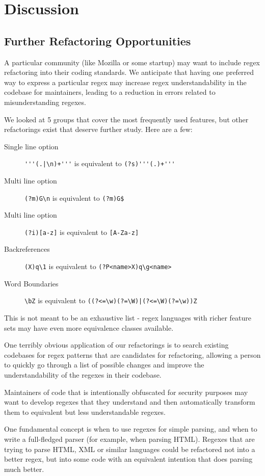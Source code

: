 \section{Discussion}
\label{sec:discussion}

\subsection{Further Refactoring Opportunities}
A particular community (like Mozilla or some startup) may want to include regex refactoring into their coding standards.  We anticipate that having one preferred way to express a particular regex may increase regex understandability in the codebase for maintainers, leading to a reduction in errors related to misunderstanding regexes.

We looked at 5 groups that cover the most frequently used features, but other refactorings exist that deserve further study.  Here are a few:
\begin{description}
\item[Single line option]  \verb!'''(.|\n)+'''! is equivalent to \verb!(?s)'''(.)+'''!
\item[Multi line option]  \verb!(?m)G\n! is equivalent to \verb!(?m)G$!
\item[Multi line option]  \verb!(?i)[a-z]! is equivalent to \verb![A-Za-z]!
\item[Backreferences]  \verb!(X)q\1! is equivalent to \verb!(?P<name>X)q\g<name>!
\item[Word Boundaries]  \verb!\bZ! is equivalent to \verb!((?<=\w)(?=\W)|(?<=\W)(?=\w))Z!
\end{description}

This is not meant to be an exhaustive list - regex languages with richer feature sets may have even more equivalence classes available.

One terribly obvious application of our refactorings is to search existing codebases for regex patterns that are candidates for refactoring, allowing a person to quickly go through a list of possible changes and improve the understandability of the regexes in their codebase.

Maintainers of code that is intentionally obfuscated for security purposes may want to develop regexes that they understand and then automatically transform them to equivalent but less understandable regexes.

One fundamental concept is when to use regexes for simple parsing, and when to write a full-fledged parser (for example, when parsing HTML).  Regexes that are trying to parse HTML, XML or similar languages could be refactored not into a better regex, but into some code with an equivalent intention that does parsing much better.

